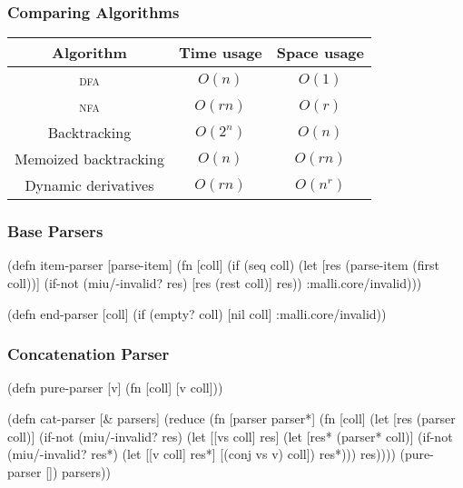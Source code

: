 \documentclass{beamer}
\begin{document}

\begin{frame}
\frametitle{Comparing Algorithms}

\begin{center}
\begin{tabular}{c | c c}
Algorithm & Time usage & Space usage \\
\hline
\textsc{dfa} & \(O(n)\) & \(O(1)\) \\
\textsc{nfa} & \(O(rn)\) & \(O(r)\) \\
Backtracking & \(O(2^n)\) & \(O(n)\) \\
Memoized backtracking & \(O(n)\) & \(O(rn)\) \\
Dynamic derivatives & \(O(rn)\) & \(O(n^r)\)
\end{tabular}
\end{center}

\end{frame}


\begin{frame}[fragile]
\frametitle{Base Parsers}

\begin{semiverbatim}
(defn item-parser [parse-item]
  (fn [coll]
    (if (seq coll)
      (let [res (parse-item (first coll))]
        (if-not (miu/-invalid? res)
          [res (rest coll)]
          res))
      :malli.core/invalid)))
\end{semiverbatim}

\begin{semiverbatim}
(defn end-parser [coll]
  (if (empty? coll)
    [nil coll]
    :malli.core/invalid))
\end{semiverbatim}

\end{frame}


\begin{frame}[fragile]
\frametitle{Concatenation Parser}

\begin{semiverbatim}
(defn pure-parser [v] (fn [coll] [v coll]))
\end{semiverbatim}

\begin{semiverbatim}
(defn cat-parser [& parsers]
  (reduce (fn [parser parser*]
            (fn [coll]
              (let [res (parser coll)]
                (if-not (miu/-invalid? res)
                  (let [[vs coll] res]
                    (let [res* (parser* coll)]
                      (if-not (miu/-invalid? res*)
                        (let [[v coll] res*]
                          [(conj vs v) coll])
                        res*)))
                  res))))
          (pure-parser []) parsers))
\end{semiverbatim}

\end{frame}
\end{document}

